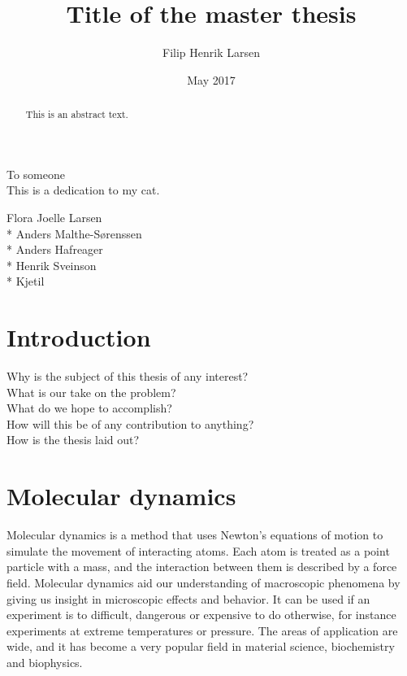 \documentclass[twoside,english]{uiofysmaster}
\author{Filip Henrik Larsen}
\title{Title of the master thesis}
\date{May 2017}
\begin{document}
\maketitle

\begin{abstract}
This is an abstract text.
\end{abstract}

\begin{dedication}
  To someone
  \\\vspace{12pt}
  This is a dedication to my cat.
\end{dedication}

\begin{acknowledgements}
  Flora Joelle Larsen\\*
  Anders Malthe-Sørenssen \\*
  Anders Hafreager \\*
  Henrik Sveinson \\*
  Kjetil
\end{acknowledgements}
{
\hypersetup{linkcolor = black}
\tableofcontents
}
\chapter{Introduction}

Why is the subject of this thesis of any interest?\\
What is our take on the problem?\\
What do we hope to accomplish?\\
How will this be of any contribution to anything?\\
How is the thesis laid out?


\chapter{Molecular dynamics}
Molecular dynamics is a method that uses Newton’s equations of motion to simulate the movement of interacting atoms. 
Each atom is treated as a point particle with a mass, and the interaction between them is described by a force field. 
Molecular dynamics aid our understanding of macroscopic phenomena by giving us insight in microscopic effects and behavior. 
It can be used if an experiment is to difficult, dangerous or expensive to do otherwise, for instance experiments at extreme temperatures or pressure. 
The areas of application are wide, and it has become a very popular field in material science, biochemistry and biophysics.
\end{document}
